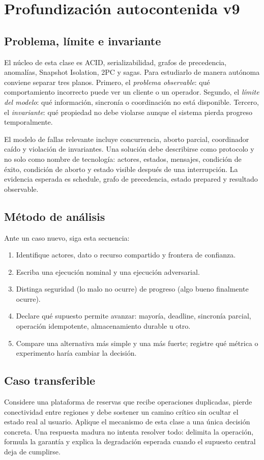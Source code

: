\documentclass[variant=apuntes,cover=institutional,mode=screen]{ua-engineering-v6-article}
\begin{document}
\section{Profundización autocontenida v9}
\subsection{Problema, límite e invariante}
El núcleo de esta clase es ACID, serializabilidad, grafos de precedencia, anomalías, Snapshot Isolation, 2PC y sagas. Para estudiarlo de manera autónoma conviene separar tres planos. Primero, el \emph{problema observable}: qué comportamiento incorrecto puede ver un cliente o un operador. Segundo, el \emph{límite del modelo}: qué información, sincronía o coordinación no está disponible. Tercero, el \emph{invariante}: qué propiedad no debe violarse aunque el sistema pierda progreso temporalmente.

El modelo de fallas relevante incluye concurrencia, aborto parcial, coordinador caído y violación de invariantes. Una solución debe describirse como protocolo y no solo como nombre de tecnología: actores, estados, mensajes, condición de éxito, condición de aborto y estado visible después de una interrupción. La evidencia esperada es schedule, grafo de precedencia, estado prepared y resultado observable.

\subsection{Método de análisis}
Ante un caso nuevo, siga esta secuencia:
\begin{enumerate}
\item Identifique actores, dato o recurso compartido y frontera de confianza.
\item Escriba una ejecución nominal y una ejecución adversarial.
\item Distinga seguridad (lo malo no ocurre) de progreso (algo bueno finalmente ocurre).
\item Declare qué supuesto permite avanzar: mayoría, deadline, sincronía parcial, operación idempotente, almacenamiento durable u otro.
\item Compare una alternativa más simple y una más fuerte; registre qué métrica o experimento haría cambiar la decisión.
\end{enumerate}

\subsection{Caso transferible}
Considere una plataforma de reservas que recibe operaciones duplicadas, pierde conectividad entre regiones y debe sostener un camino crítico sin ocultar el estado real al usuario. Aplique el mecanismo de esta clase a una única decisión concreta. Una respuesta madura no intenta resolver todo: delimita la operación, formula la garantía y explica la degradación esperada cuando el supuesto central deja de cumplirse.
\end{document}
